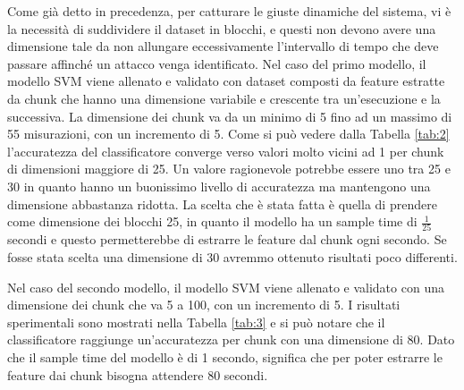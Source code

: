 \documentclass[Lau,binding=0.6cm]{sapthesis}
\begin{document}
Come gi\`a detto in precedenza, per catturare le giuste dinamiche del sistema, vi \`e la necessit\`a di suddividere il dataset in blocchi, e questi non devono avere una dimensione tale da non allungare eccessivamente l'intervallo di tempo che deve passare affinch\'e un attacco venga identificato.
Nel caso del primo modello, il modello SVM viene allenato e validato con dataset composti da feature estratte da chunk che hanno una dimensione variabile e crescente tra un'esecuzione e la successiva. La dimensione dei chunk va da un minimo di 5 fino ad un massimo di 55 misurazioni, con un incremento di 5.
Come si pu\`o vedere dalla Tabella \ref{tab:2} l'accuratezza del classificatore converge verso valori molto vicini ad 1 per chunk di dimensioni maggiore di 25.
Un valore ragionevole potrebbe essere uno tra 25 e 30 in quanto hanno un buonissimo livello di accuratezza ma mantengono una dimensione abbastanza ridotta.
La scelta che \`e stata fatta \`e quella di prendere come dimensione dei blocchi 25, in quanto il modello ha un sample time di $\frac{1}{25}$ secondi e questo permetterebbe di estrarre le feature dal chunk ogni secondo.
Se fosse stata scelta una dimensione di 30 avremmo ottenuto risultati poco differenti.

Nel caso del secondo modello, il modello SVM viene allenato e validato con una dimensione dei chunk che va 5 a 100, con un incremento di 5.
I risultati sperimentali sono mostrati nella Tabella \ref{tab:3} e si pu\`o notare che il classificatore raggiunge un'accuratezza per chunk con una dimensione di 80.
Dato che il sample time del modello \`e di 1 secondo, significa che per poter estrarre le feature dai chunk bisogna attendere 80 secondi.
\end{document}
